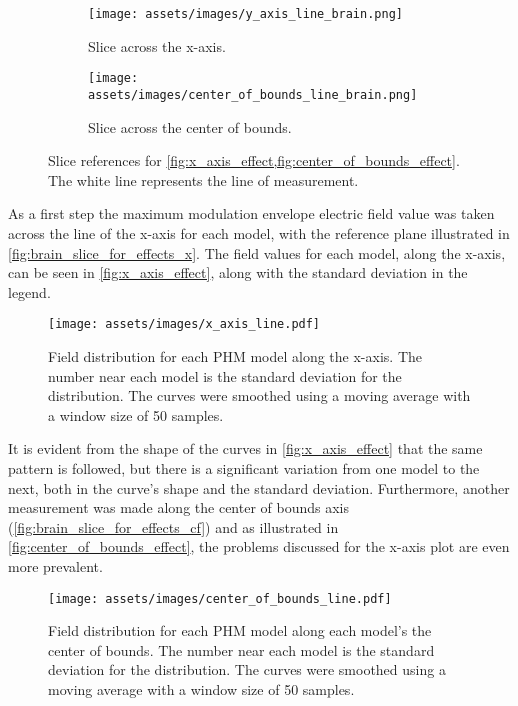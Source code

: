 \begin{figure}[H]
    \centering
    \begin{subfigure}[b]{0.49\textwidth}
        \texttt{[image: assets/images/y\_axis\_line\_brain.png]}
        \caption{Slice across the x-axis.}
        \label{fig:brain_slice_for_effects_x}
    \end{subfigure}
    \begin{subfigure}[b]{0.49\textwidth}
        \texttt{[image: assets/images/center\_of\_bounds\_line\_brain.png]}
        \caption{Slice across the center of bounds.}
        \label{fig:brain_slice_for_effects_cf}
    \end{subfigure}
    \caption{Slice references for \cref{fig:x_axis_effect,fig:center_of_bounds_effect}. The white line represents the line of measurement.}
    \label{fig:brain_slice_for_effects}
\end{figure}

As a first step the maximum modulation envelope electric field value was taken across the line of the x-axis for each model, with the reference plane illustrated in \autoref{fig:brain_slice_for_effects_x}. The field values for each model, along the x-axis, can be seen in \autoref{fig:x_axis_effect}, along with the standard deviation in the legend.

\begin{figure}[H]
    \centering
    \texttt{[image: assets/images/x\_axis\_line.pdf]}
    \caption{Field distribution for each \gls{PHM} model along the x-axis. The number near each model is the standard deviation for the distribution. The curves were smoothed using a moving average with a window size of 50 samples.}
    \label{fig:x_axis_effect}
\end{figure}

It is evident from the shape of the curves in \autoref{fig:x_axis_effect} that the same pattern is followed, but there is a significant variation from one model to the next, both in the curve's shape and the standard deviation. Furthermore, another measurement was made along the center of bounds axis (\autoref{fig:brain_slice_for_effects_cf}) and as illustrated in \autoref{fig:center_of_bounds_effect}, the problems discussed for the x-axis plot are even more prevalent.

\begin{figure}[H]
    \centering
    \texttt{[image: assets/images/center\_of\_bounds\_line.pdf]}
    \caption{Field distribution for each \gls{PHM} model along each model's the center of bounds. The number near each model is the standard deviation for the distribution. The curves were smoothed using a moving average with a window size of 50 samples.}
    \label{fig:center_of_bounds_effect}
\end{figure}

